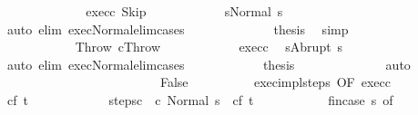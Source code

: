 \begin{isabellebody}
\isanewline
\ \ \ \ \ \ \ \ \ \ \isamarkupfalse%
\ \isamarkupfalse%
\ exec{\isacharunderscore}c\ Skip\isanewline
\ \ \ \ \ \ \ \ \ \ \isamarkupfalse%
\ {\isachardoublequoteopen}s{\isacharprime}{\isacharequal}Normal\ s{\isachardoublequoteclose}\isanewline
\ \ \ \ \ \ \ \ \ \ \ \ \isamarkupfalse%
\ {\isacharparenleft}auto\ elim{\isacharcolon}\ exec{\isacharunderscore}Normal{\isacharunderscore}elim{\isacharunderscore}cases{\isacharparenright}\isanewline
\ \ \ \ \ \ \ \ \ \ \isamarkupfalse%
\ \isamarkupfalse%
\ {\isacharquery}thesis\ \isamarkupfalse%
\ simp\isanewline
\ \ \ \ \ \ \ \ \isamarkupfalse%
\isanewline
\ \ \ \ \ \ \ \ \ \ \isamarkupfalse%
\ Throw{\isacharcolon}\ {\isachardoublequoteopen}cThrow{\isachardoublequoteclose}\isanewline
\ \ \ \ \ \ \ \ \ \ \isamarkupfalse%
\ exec{\isacharunderscore}c\ \isamarkupfalse%
\ {\isachardoublequoteopen}s{\isacharprime}{\isacharequal}Abrupt\ s{\isachardoublequoteclose}\isanewline
\ \ \ \ \ \ \ \ \ \ \ \ \isamarkupfalse%
\ {\isacharparenleft}auto\ elim{\isacharcolon}\ exec{\isacharunderscore}Normal{\isacharunderscore}elim{\isacharunderscore}cases{\isacharparenright}\isanewline
\ \ \ \ \ \ \ \ \ \ \isamarkupfalse%
\ {\isacharquery}thesis\isanewline
\ \ \ \ \ \ \ \ \ \ \ \ \isamarkupfalse%
\ auto\isanewline
\ \ \ \ \ \ \ \ \isamarkupfalse%
\isanewline
\ \ \ \ \ \ \isamarkupfalse%
\isanewline
\ \ \ \ \ \ \ \ \isamarkupfalse%
\ False\isanewline
\ \ \ \ \ \ \ \ \isamarkupfalse%
\ exec{\isacharunderscore}impl{\isacharunderscore}steps\ {\isacharbrackleft}OF\ exec{\isacharunderscore}c\isanewline
\ \ \ \ \ \ \ \ \isamarkupfalse%
\ c\isactrlsub f\ t\ \ \isanewline
\ \ \ \ \ \ \ \ \ \ steps{\isacharunderscore}c\ {\isachardoublequoteopen}{\isasymGamma}{\isasymturnstile}\ {\isacharparenleft}c\ Normal\ s{\isacharparenright}\ {\isasymrightarrow}\isactrlsup {\isacharasterisk}\ {\isacharparenleft}c\isactrlsub f{\isacharcomma}\ t{\isacharparenright}{\isachardoublequoteclose}\ \isanewline
\ \ \ \ \ \ \ \ \ \ fin{\isacharcolon}{\isachardoublequoteopen}{\isacharparenleft}case\ s{\isacharprime}\ of\isanewline

\end{isabellebody}
